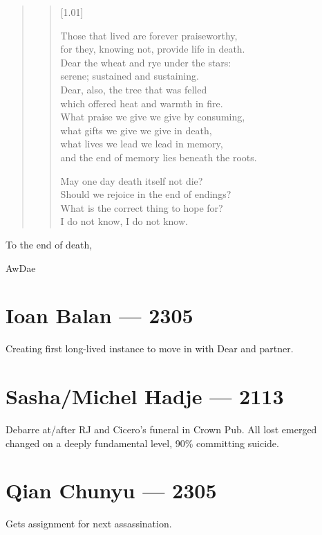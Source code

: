 \begin{quote}
\begin{verse}[1.01\textwidth]




    Those that lived are forever praiseworthy,\\
    for they, knowing not, provide life in death.\\
    Dear the wheat and rye under the stars:\\
    serene; sustained and sustaining.\\
    Dear, also, the tree that was felled\\
    which offered heat and warmth in fire.\\
    What praise we give we give by consuming,\\
    what gifts we give we give in death,\\
    what lives we lead we lead in memory,\\
    and the end of memory lies beneath the roots.


    May one day death itself not die?\\
    Should we rejoice in the end of endings?\\
    What is the correct thing to hope for?\\
    I do not know, I do not know.
  \end{verse}

\end{quote}
To the end of death,

AwDae

\chapter*{Ioan Balan — 2305}

Creating first long-lived instance to move in with Dear and partner.

\chapter*{Sasha/Michel Hadje — 2113}

Debarre at/after RJ and Cicero's funeral in Crown Pub. All lost emerged changed on a deeply fundamental level, 90\% committing suicide.

\chapter*{Qian Chunyu — 2305}

Gets assignment for next assassination.
